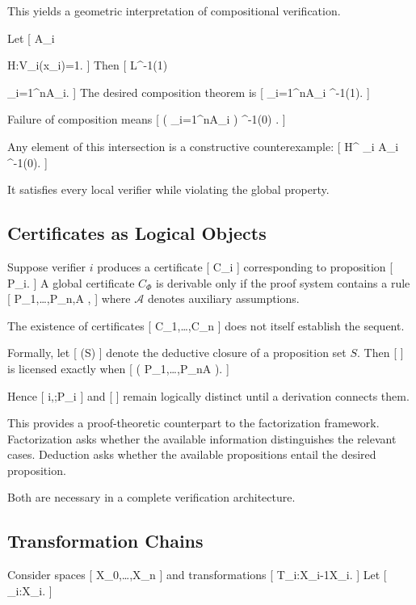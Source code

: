 \documentclass[11pt]{article}
\begin{document}
This yields a geometric interpretation of compositional verification.

Let
[
A_i

{H:V_i(x_i)=1}.
]
Then
[
L^{-1}(1)

\bigcap_{i=1}^{n}A_i.
]
The desired composition theorem is
[
\bigcap_{i=1}^{n}A_i
\subseteq
\Phi^{-1}(1).
]

Failure of composition means
[
\left(
\bigcap_{i=1}^{n}A_i
\right)
\cap
\Phi^{-1}(0)
\neq
\varnothing.
]

Any element of this intersection is a constructive counterexample:
[
H^\star
\in
\bigcap_i A_i
\cap
\Phi^{-1}(0).
]

It satisfies every local verifier while violating the global property.

\subsection{Certificates as Logical Objects}

Suppose verifier $i$ produces a certificate
[
C_i
]
corresponding to proposition
[
P_i.
]
A global certificate $C_\Phi$ is derivable only if the proof system contains a rule
[
P_1,\ldots,P_n,\mathcal A
\vdash
\Phi,
]
where $\mathcal A$ denotes auxiliary assumptions.

The existence of certificates
[
C_1,\ldots,C_n
]
does not itself establish the sequent.

Formally, let
[
(S)
]
denote the deductive closure of a proposition set $S$. Then
[
\Phi
]
is licensed exactly when
[
\Phi
\in
{}
\left(
{P_1,\ldots,P_n}\cup\mathcal A
\right).
]

Hence
[
\forall i,;P_i
]
and
[
\Phi
]
remain logically distinct until a derivation connects them.

This provides a proof-theoretic counterpart to the factorization framework. Factorization asks whether the available information distinguishes the relevant cases. Deduction asks whether the available propositions entail the desired proposition.

Both are necessary in a complete verification architecture.

\subsection{Transformation Chains}

Consider spaces
[
\mathcal X_0,\ldots,\mathcal X_n
]
and transformations
[
T_i:\mathcal X_{i-1}\to\mathcal X_i.
]
Let
[
\Phi_i:\mathcal X_i.
]
\end{document}
